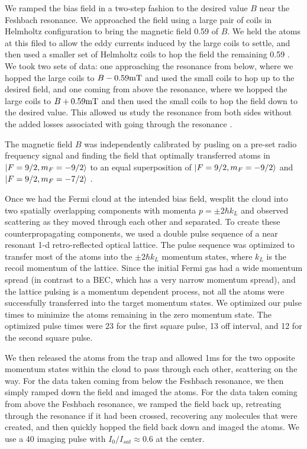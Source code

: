 \documentclass[12pt]{iopart}
\begin{document}
\par We ramped the bias field in a two-step fashion to the desired value $B$ near the Feshbach resonance. We approached the field using a large pair of  coils in Helmholtz configuration to bring the magnetic field 0.59 \mT{} of $B$. We held the atoms at this filed to allow the eddy currents induced by the large coils to settle, and then used a smaller set of Helmholtz coils to hop the field the remaining 0.59 \mT{}. We took two sets of data: one approaching the resonance from below, where we hopped the large coils to $B-0.59 \mT{}$ and used the small coils to hop up to the desired field, and one coming from above the resonance, where we hopped the large coils to  $B+0.59  \mT{}$ and then used the small coils to hop the field down to the desired value. This allowed us study the resonance from both sides without the added losses associated with going through the resonance \cite{Chin10}.
\par The magnetic field $B$ was independently calibrated by pusling on a pre-set radio frequency signal and finding the field that optimally transferred \K{} atoms in $\mathinner{|{F=9/2,m_F=-9/2}\rangle}$ to an equal superposition of $\mathinner{|{F=9/2,m_F=-9/2}\rangle}$ and $\mathinner{|{F=9/2,m_F=-7/2}\rangle}$ .
\par Once we had the Fermi cloud at the intended bias field, wesplit the cloud into two spatially overlapping components with momenta $p=\pm 2\hbar k_L$  and observed scattering as they moved through each other and separated. To create these counterpropagating components, we used a double pulse sequence \cite{Wu05} of a near resonant 1-d retro-reflected optical lattice. The pulse sequence was optimized to transfer most of the atoms into the $\pm 2 \hbar k_L$ momentum states, where $k_L$ is the recoil momentum of the lattice. Since the initial Fermi gas had a wide momentum spread (in contrast to a BEC, which has a very narrow momentum spread), and the lattice pulsing is a momentum dependent process, not all the atoms were successfully transferred into the target momentum states. We optimized our pulse times to minimize the atoms remaining in the zero momentum state. The optimized pulse times were 23 \us{} for the first square pulse, 13 \us{} off interval, and 12 \us{} for the second square pulse. 
\par We then released the atoms from the trap and allowed 1ms for the two opposite momentum states within the cloud to pass through each other, scattering on the way. For the data taken coming from below the Feshbach resonance, we then simply ramped down the field and imaged the atoms. For the data taken coming from above the Feshbach resonance, we ramped the field back up, retreating through the resonance if it had been crossed, recovering any molecules that were created, and then quickly hopped the field back down and imaged the atoms. We use a 40 \us{} imaging pulse with $I_0/I_{sat}\approx 0.6$ at the center. 
\end{document}
